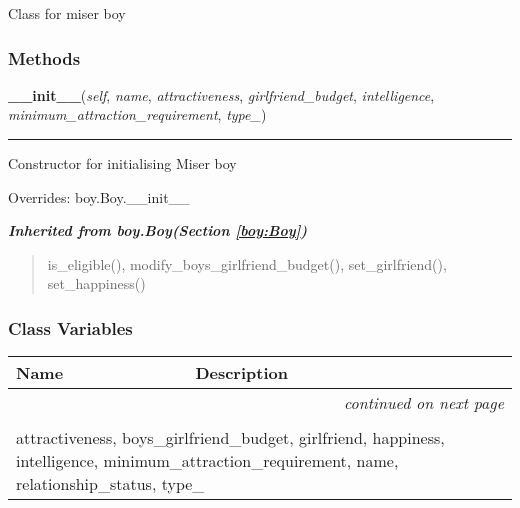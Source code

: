 Class for miser boy



  \subsubsection{Methods}

    \vspace{0.5ex}

\hspace{.8\funcindent}\begin{boxedminipage}{\funcwidth}

    \raggedright \textbf{\_\_init\_\_}(\textit{self}, \textit{name}, \textit{attractiveness}, \textit{girlfriend\_budget}, \textit{intelligence}, \textit{minimum\_attraction\_requirement}, \textit{type\_})

    \vspace{-1.5ex}

    \rule{\textwidth}{0.5\fboxrule}
\setlength{\parskip}{2ex}
    Constructor for initialising Miser boy

\setlength{\parskip}{1ex}
      Overrides: boy.Boy.\_\_init\_\_

    \end{boxedminipage}


\large{\textbf{\textit{Inherited from boy.Boy\textit{(Section \ref{boy:Boy})}}}}

\begin{quote}
is\_eligible(), modify\_boys\_girlfriend\_budget(), set\_girlfriend(), set\_happiness()
\end{quote}


  \subsubsection{Class Variables}

    \vspace{-1cm}
\hspace{\varindent}\begin{longtable}{|p{\varnamewidth}|p{\vardescrwidth}|l}
\cline{1-2}
\cline{1-2} \centering \textbf{Name} & \centering \textbf{Description}& \\
\cline{1-2}
\endhead\cline{1-2}\multicolumn{3}{r}{\small\textit{continued on next page}}\\\endfoot\cline{1-2}
\endlastfoot\multicolumn{2}{|l|}{\textit{Inherited from boy.Boy \textit{(Section \ref{boy:Boy})}}}\\
\multicolumn{2}{|p{\varwidth}|}{\raggedright attractiveness, boys\_girlfriend\_budget, girlfriend, happiness, intelligence, minimum\_attraction\_requirement, name, relationship\_status, type\_}\\
\cline{1-2}
\end{longtable}

